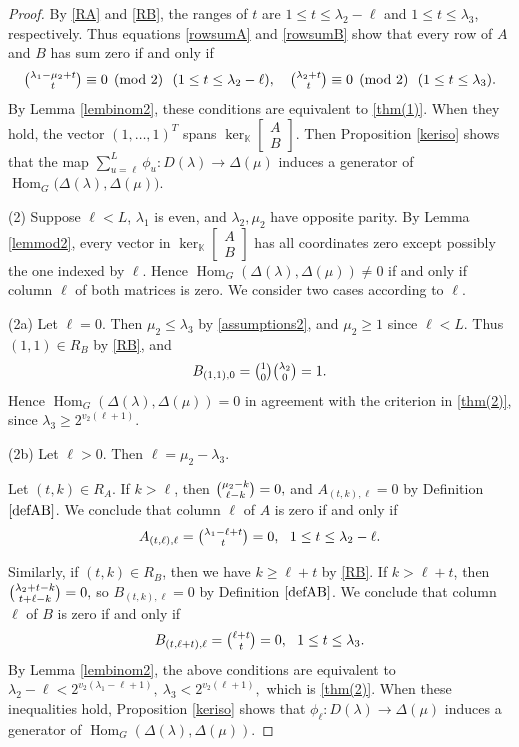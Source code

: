 \documentclass[11pt]{amsart}
\theoremstyle{remark}
\theoremstyle{definition}
\newcommand{\Hom}{\operatorname{Hom}}
\newcommand{\D}{\Delta}
\newcommand{\la}{\lambda}
\newcommand{\K}{\mathbb K}
\numberwithin{equation}{section}
\begin{document}
\begin{proof}
By \eqref{RA} and \eqref{RB}, the ranges of $t$
are $1\le t\le\la_2-\ell$ and
$1\le t\le\la_3$, respectively.
	Thus equations \eqref{rowsumA} and \eqref{rowsumB} show that every row
	of $A$ and $B$ has sum zero if and only if
	\[
	\tbinom{\la_1-\mu_2+t}{t}
	\equiv0\pmod2 \ \
	(1\le t\le\la_2-\ell),\ \ \
	\tbinom{\la_2+t}{t}
	\equiv0\pmod2 \ \
	(1\le t\le\la_3).
	\]
	By Lemma \ref{lembinom2}, these conditions
	are equivalent to \eqref{thm(1)}.
	When they hold, the vector $(1,\ldots,1)^T$ spans 	$\ker_\K\left[\begin{smallmatrix}A\\B\end{smallmatrix}\right]$. Then Proposition \ref{keriso} shows
	that the map $\sum_{u=\ell}^{L}\phi_u : D(\la) \to \D(\mu)$ induces
	a generator of $\Hom_G\bigl(\Delta(\la),\Delta(\mu)\bigr)$.
	
	(2) Suppose $\ell<L$, $\la_1$ is even,
	and $\la_2, \mu_2$ have opposite parity.
	By Lemma \ref{lemmod2}, every vector in
	$\ker_\K\left[\begin{smallmatrix}A\\B\end{smallmatrix}\right]$
	has all coordinates zero except possibly the one indexed by $\ell$.
	Hence $\Hom_G(\Delta(\la),\Delta(\mu)) \neq 0$ if and only if
	column $\ell$ of both matrices is zero. We consider  two cases according to $\ell$.
	
(2a) Let $\ell=0$. Then $\mu_2\le\la_3$ by
\eqref{assumptions2}, and $\mu_2\ge1$ since $\ell<L$.
Thus $(1,1)\in R_B$ by \eqref{RB}, and
\[
B_{(1,1),0}
=\tbinom10\tbinom{\la_2}{0}=1.
\]
Hence $\Hom_G(\Delta(\la),\Delta(\mu))=0$ 
in agreement with the criterion in \eqref{thm(2)}, since $\lambda_3\ge 2^{v_2(\ell+1)}$.
	

(2b) Let $\ell>0$. Then $\ell=\mu_2-\la_3$.

Let $(t,k)\in R_A$. If $k>\ell$, then
$
\tbinom{\mu_2-k}{\ell-k}=0,
$
and $A_{(t,k),\ell}=0$ by Definition $\ref{defAB}$.
We conclude that column $\ell$ of $A$ is zero if and only if
\[
A_{(t,\ell),\ell}
=\tbinom{\la_1-\ell+t}{t} =0, \ \ 1\le t\le\la_2-\ell.
\]

Similarly, if $(t,k)\in R_B$, then we have
$k\ge\ell+t$ by \eqref{RB}. If $k>\ell+t$, then
$
\tbinom{\la_2+t-k}{t+\ell-k}=0,
$
so $B_{(t,k),\ell}=0$ by Definition $\ref{defAB}$.
We conclude that column $\ell$ of $B$ is zero if and only if
\[
B_{(t,\ell+t),\ell}
=\tbinom{\ell+t}{t} =0, \ \ 1\le t\le\la_3.
\]
By Lemma \ref{lembinom2}, the above conditions
are equivalent to
$
\la_2-\ell<2^{v_2(\la_1-\ell+1)},
\ 
\la_3<2^{v_2(\ell+1)},
$
which is \eqref{thm(2)}. When these inequalities hold, Proposition
\ref{keriso} shows that
$\phi_\ell:D(\la)\to\D(\mu)$ induces a
generator of
$\Hom_G(\Delta(\la),\Delta(\mu))$.
	


\end{proof}
\end{document}
